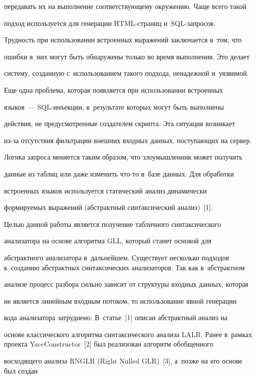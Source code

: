 передавать их на выполнение соответствующему окружению. Чаще всего такой


подход используется для генерации HTML-стра\-ниц и~SQL-за\-про\-сов.


Трудность при использовании встроенных выражений заключается в~том, что


ошибки в~них могут быть обнаружены только во время выполнения. Это делает


сис\-те\-му, созданную с~использованием такого подхода, ненадежной и~уязвимой.


Еще одна проблема, которая появляется при использовании встроенных


языков~--- SQL-инъек\-ции, в~результате которых могут быть выполнены


действия, не предусмот\-рен\-ные создателем скрипта. Эта ситуация возникает


из-за отсутствия фильтрации внешних входных данных, поступающих на сервер.


Логика запроса меняется таким образом, что злоумышленник может получить


данные из таблиц или даже изменить что-то в~базе данных. Для обработки


встроенных языков используется статический анализ динамически


формируемых выражений (абстрактный синтаксический анализ)~[1].





Целью данной работы является получение табличного синтаксического


анализатора на основе алгоритма GLL, который станет основой для


абстрактного анализатора в~дальнейшем. Существует несколько подходов к~созданию абстрактных синтаксических анализаторов. Так как в~абстрактном


анализе процесс разбора сильно зависит от структуры входных данных, которая


не является линейным входным потоком, то использование явной генерации


кода анализатора затруднено. В~статье~[1] описан абстрактный анализ на


основе классического алгоритма синтаксического анализа LALR. Ранее в~рамках проекта YaccConstructor~[2] был реализован алгоритм обобщенного


восходящего анализа RNGLR (Right Nulled GLR)~[3], а~позже на его основе был создан


